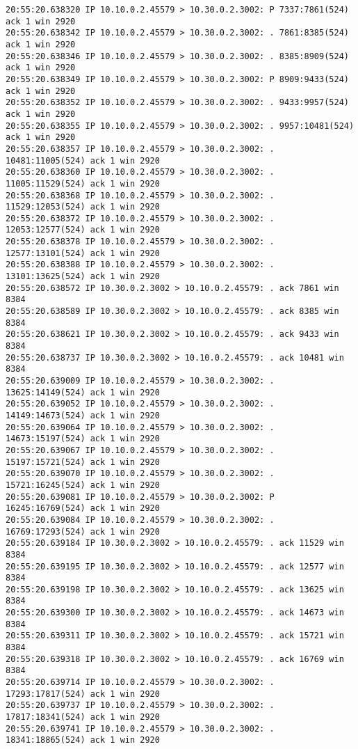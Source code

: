 \documentclass[a4paper,12pt]{article}
\begin{document}
\begin{Verbatim}
20:55:20.638320 IP 10.10.0.2.45579 > 10.30.0.2.3002: P 7337:7861(524) ack 1 win 2920 
20:55:20.638342 IP 10.10.0.2.45579 > 10.30.0.2.3002: . 7861:8385(524) ack 1 win 2920 
20:55:20.638346 IP 10.10.0.2.45579 > 10.30.0.2.3002: . 8385:8909(524) ack 1 win 2920 
20:55:20.638349 IP 10.10.0.2.45579 > 10.30.0.2.3002: P 8909:9433(524) ack 1 win 2920 
20:55:20.638352 IP 10.10.0.2.45579 > 10.30.0.2.3002: . 9433:9957(524) ack 1 win 2920 
20:55:20.638355 IP 10.10.0.2.45579 > 10.30.0.2.3002: . 9957:10481(524) ack 1 win 2920 
20:55:20.638357 IP 10.10.0.2.45579 > 10.30.0.2.3002: . 10481:11005(524) ack 1 win 2920 
20:55:20.638360 IP 10.10.0.2.45579 > 10.30.0.2.3002: . 11005:11529(524) ack 1 win 2920 
20:55:20.638368 IP 10.10.0.2.45579 > 10.30.0.2.3002: . 11529:12053(524) ack 1 win 2920 
20:55:20.638372 IP 10.10.0.2.45579 > 10.30.0.2.3002: . 12053:12577(524) ack 1 win 2920 
20:55:20.638378 IP 10.10.0.2.45579 > 10.30.0.2.3002: . 12577:13101(524) ack 1 win 2920 
20:55:20.638388 IP 10.10.0.2.45579 > 10.30.0.2.3002: . 13101:13625(524) ack 1 win 2920 
20:55:20.638572 IP 10.30.0.2.3002 > 10.10.0.2.45579: . ack 7861 win 8384 
20:55:20.638589 IP 10.30.0.2.3002 > 10.10.0.2.45579: . ack 8385 win 8384 
20:55:20.638621 IP 10.30.0.2.3002 > 10.10.0.2.45579: . ack 9433 win 8384 
20:55:20.638737 IP 10.30.0.2.3002 > 10.10.0.2.45579: . ack 10481 win 8384 
20:55:20.639009 IP 10.10.0.2.45579 > 10.30.0.2.3002: . 13625:14149(524) ack 1 win 2920 
20:55:20.639052 IP 10.10.0.2.45579 > 10.30.0.2.3002: . 14149:14673(524) ack 1 win 2920 
20:55:20.639064 IP 10.10.0.2.45579 > 10.30.0.2.3002: . 14673:15197(524) ack 1 win 2920 
20:55:20.639067 IP 10.10.0.2.45579 > 10.30.0.2.3002: . 15197:15721(524) ack 1 win 2920 
20:55:20.639070 IP 10.10.0.2.45579 > 10.30.0.2.3002: . 15721:16245(524) ack 1 win 2920 
20:55:20.639081 IP 10.10.0.2.45579 > 10.30.0.2.3002: P 16245:16769(524) ack 1 win 2920 
20:55:20.639084 IP 10.10.0.2.45579 > 10.30.0.2.3002: . 16769:17293(524) ack 1 win 2920 
20:55:20.639184 IP 10.30.0.2.3002 > 10.10.0.2.45579: . ack 11529 win 8384 
20:55:20.639195 IP 10.30.0.2.3002 > 10.10.0.2.45579: . ack 12577 win 8384 
20:55:20.639198 IP 10.30.0.2.3002 > 10.10.0.2.45579: . ack 13625 win 8384
20:55:20.639300 IP 10.30.0.2.3002 > 10.10.0.2.45579: . ack 14673 win 8384
20:55:20.639311 IP 10.30.0.2.3002 > 10.10.0.2.45579: . ack 15721 win 8384
20:55:20.639318 IP 10.30.0.2.3002 > 10.10.0.2.45579: . ack 16769 win 8384
20:55:20.639714 IP 10.10.0.2.45579 > 10.30.0.2.3002: . 17293:17817(524) ack 1 win 2920
20:55:20.639737 IP 10.10.0.2.45579 > 10.30.0.2.3002: . 17817:18341(524) ack 1 win 2920
20:55:20.639741 IP 10.10.0.2.45579 > 10.30.0.2.3002: . 18341:18865(524) ack 1 win 2920

\end{Verbatim}
\end{document}
